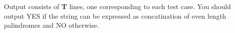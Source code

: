 Output consists of   \textbf{    T   }   lines, one corresponding to each test case. You should output   YES   if the string can be expressed as concatination of even length palindromes and   NO   otherwise.